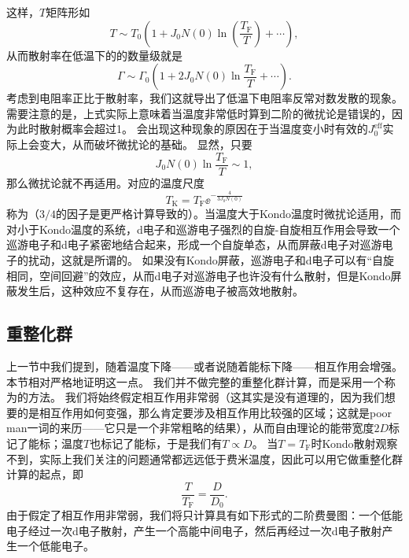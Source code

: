 这样，$T$矩阵形如
\[
    T \sim T_0 \left( 1 + J_0 N(0) \ln(\frac{T_\text{F}}{T}) + \cdots \right),
\]
从而散射率在低温下的的数量级就是
\begin{equation}
    \Gamma \sim \Gamma_0 \left(1 + 2 J_0 N(0) \ln \frac{T_\text{F}}{T} + \cdots \right).
\end{equation}
考虑到电阻率正比于散射率，我们这就导出了低温下电阻率反常对数发散的现象。
需要注意的是，上式实际上意味着当温度非常低时算到二阶的微扰论是错误的，因为此时散射概率会超过1。
会出现这种现象的原因在于当温度变小时有效的$J_{0}^\text{eff}$实际上会变大，从而破坏微扰论的基础。
显然，只要
\begin{equation}
    J_0 N(0) \ln \frac{T_\text{F}}{T} \sim 1,
\end{equation}
那么微扰论就不再适用。对应的温度尺度
\begin{equation}
    T_\text{K} = T_\text{F} \ee^{- \frac{4}{3J_0 N(0)}}
\end{equation}
称为（$3/4$的因子是更严格计算导致的）。当温度大于Kondo温度时微扰论适用，而对小于Kondo温度的系统，d电子和巡游电子强烈的自旋-自旋相互作用会导致一个巡游电子和d电子紧密地结合起来，形成一个自旋单态，从而屏蔽d电子对巡游电子的扰动，这就是所谓的。
如果没有Kondo屏蔽，巡游电子和d电子可以有“自旋相同，空间回避”的效应，从而d电子对巡游电子也许没有什么散射，但是Kondo屏蔽发生后，这种效应不复存在，从而巡游电子被高效地散射。

\subsection{重整化群}

上一节中我们提到，随着温度下降——或者说随着能标下降——相互作用会增强。本节相对严格地证明这一点。
我们并不做完整的重整化群计算，而是采用一个称为的方法。
我们将始终假定相互作用非常弱（这其实是没有道理的，因为我们想要的是相互作用如何变强，那么肯定要涉及相互作用比较强的区域；这就是poor man一词的来历——它只是一个非常粗略的结果），从而自由理论的能带宽度$2 D$标记了能标；温度$T$也标记了能标，于是我们有$T \propto D$。
当$T=T_\text{F}$时Kondo散射观察不到，实际上我们关注的问题通常都远远低于费米温度，因此可以用它做重整化群计算的起点，即
\begin{equation}
    \frac{T}{T_\text{F}} = \frac{D}{D_0}.
\end{equation}
由于假定了相互作用非常弱，我们将只计算具有如下形式的二阶费曼图：一个低能电子经过一次d电子散射，产生一个高能中间电子，然后再经过一次d电子散射产生一个低能电子。

